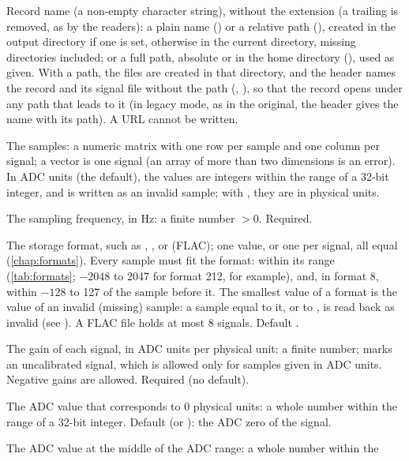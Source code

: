 \begin{params}
\item[record] Record name (a non-empty character string), without the 
  extension (a trailing  is removed, as by the readers): a plain name () or a relative path (), created
  in the output directory if one is set, otherwise in the current directory, missing
  directories included; or a full path, absolute or in the home directory
  (), used as given. With a path, the files are created in that
  directory, and the header names the record and its signal file without the path
  (, ), so that the record opens under any path that leads to it
  (in legacy mode, as in the original, the header gives the name with its path). A URL
  cannot be written.
\item[signals] The samples: a numeric matrix with one row per sample and one column per
  signal; a vector is one signal (an array of more than two dimensions is an error). In ADC units (the default), the values are integers
  within the range of a 32-bit integer, and  is written as an invalid sample;
  with , they are in physical units.
\item[fs] The sampling frequency, in Hz: a finite number $> 0$. Required.
\item[fmt] The storage format, such as , ,  or 
  (FLAC); one value, or one per signal, all equal (\cref{chap:formats}). Every sample
  must fit the format: within its range (\cref{tab:formats}; $-2048$ to 2047 for format
  212, for example), and, in format 8, within $-128$ to 127 of the sample before it. The
  smallest value of a format is the value of an invalid (missing) sample: a sample equal
  to it, or to , is read back as invalid (see
  ). A FLAC file holds at most 8 signals. Default .
\item[gains] The gain of each signal, in ADC units per physical unit: a finite number;
   marks an uncalibrated signal, which is allowed only for samples given in ADC
  units. Negative gains are allowed. Required (no default).
\item[baselines] The ADC value that corresponds to 0 physical units: a whole number
  within the range of a 32-bit integer. Default  (or ): the ADC zero of
  the signal.
\item[adczeros] The ADC value at the middle of the ADC range: a whole number within the

\end{params}

